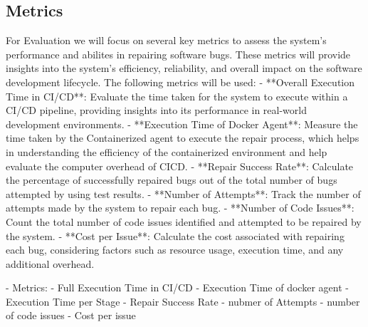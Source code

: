 \subsection{Metrics}
For Evaluation we will focus on several key metrics to assess the system's performance and abilites in repairing software bugs. These metrics will provide insights into the system's efficiency, reliability, and overall impact on the software development lifecycle. The following metrics will be used:
- **Overall Execution Time in CI/CD**: Evaluate the time taken for the system to execute within a CI/CD pipeline, providing insights into its performance in real-world development environments.
- **Execution Time of Docker Agent**: Measure the time taken by the Containerized agent to execute the repair process, which helps in understanding the efficiency of the containerized environment and help evaluate the computer overhead of CICD.
- **Repair Success Rate**: Calculate the percentage of successfully repaired bugs out of the total number of bugs attempted by using test results.
- **Number of Attempts**: Track the number of attempts made by the system to repair each bug.
- **Number of Code Issues**: Count the total number of code issues identified and attempted to be repaired by the system.
- **Cost per Issue**: Calculate the cost associated with repairing each bug, considering factors such as resource usage, execution time, and any additional overhead.



- Metrics:
- Full Execution Time in CI/CD
- Execution Time of docker agent
- Execution Time per Stage
- Repair Success Rate
- nubmer of Attempts
- number of code issues
- Cost per issue

